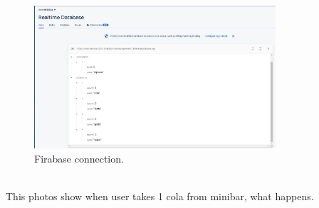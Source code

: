 \begin{figure}[!htbp]
    \centering
    \includegraphics[width=0.8\textwidth]{Imgs/firebase1.png}
    \caption{\label{fig:Firabase}Firabase connection.}
\end{figure}
\\

This photos show when user takes 1 cola from minibar, what happens.